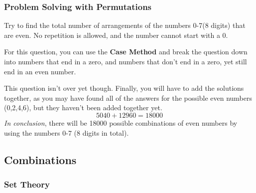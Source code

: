     \clearpage
        \subsubsection{Problem Solving with Permutations}
            \begin{example}
            Try to find the total number of arrangements of the numbers 0-7(8 digits) that are even. No repetition is allowed, and the number cannot start with a 0.
            \end{example}
            For this question, you can use the \textbf{Case Method} and break the question down into numbers that end in a zero, and numbers that don't end in a zero, yet still end in an even number. 
            \begin{parcolumns}{2}
            \colplacechunks
            \end{parcolumns}
            This question isn't over yet though. Finally, you will have to add the solutions together, as you may have found all of the answers for the possible even numbers (0,2,4,6), but they haven't been added together yet.
            $$5040 + 12960 = 18000$$
            \emph{In conclusion}, there will be 18000 possible combinations of even numbers by using the numbers 0-7 (8 digits in total).
            
    \subsection{Combinations}
    
        \subsubsection{Set Theory}
        
